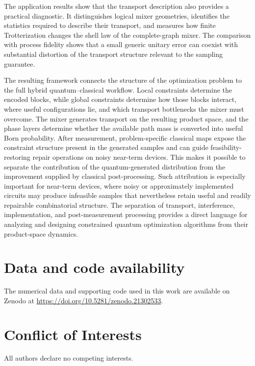 \documentclass[a4paper,onecolumn,11pt,unpublished]{quantumarticle}
\theoremstyle{remark}
\begin{document}
The application results show that the transport description also provides a practical diagnostic. It distinguishes logical mixer geometries, identifies the statistics required to describe their transport, and measures how finite Trotterization changes the shell law of the complete-graph mixer. The comparison with process fidelity shows that a small generic unitary error can coexist with substantial distortion of the transport structure relevant to the sampling guarantee.

The resulting framework connects the structure of the optimization problem to the full hybrid quantum--classical workflow. Local constraints determine the encoded blocks, while global constraints determine how those blocks interact, where useful configurations lie, and which transport bottlenecks the mixer must overcome. The mixer generates transport on the resulting product space, and the phase layers determine whether the available path mass is converted into useful Born probability. After measurement, problem-specific classical maps expose the constraint
structure present in the generated samples and can guide feasibility-restoring repair operations on noisy near-term devices. This makes it possible to separate the contribution of the quantum-generated distribution from the improvement supplied by classical post-processing. Such attribution is especially important for near-term devices, where noisy or approximately implemented circuits may produce infeasible samples that nevertheless retain useful and readily repairable combinatorial structure. The separation of transport, interference, implementation, and post-measurement processing provides a direct language for analyzing and designing constrained quantum optimization algorithms from their product-space dynamics.




\section*{Data and code availability}

The numerical data and supporting code used in this work are available on Zenodo at
\href{https://doi.org/10.5281/zenodo.21302533}
{https://doi.org/10.5281/zenodo.21302533}.


\section*{Conflict of Interests}
All authors declare no competing interests.
\end{document}
